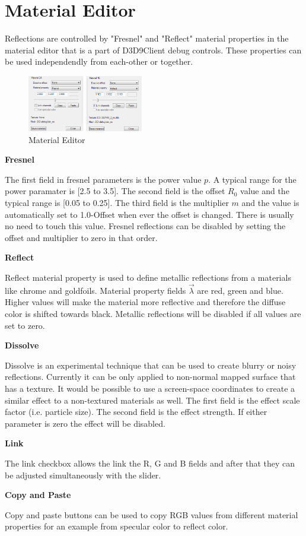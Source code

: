 \documentclass[twocolumn]{report}
\newenvironment{twocol}[0]{%
\begin{list}{}{%
\onecolumn
\setlength{\leftmargin}{0.15cm}%
\setlength{\rightmargin}{0.15cm}%
\setlength{\topmargin}{0cm}%
\setlength{\headheight}{0cm}%
\setlength{\headsep}{0cm}%
\setlength{\textheight}{24cm}%
}%
\item[]}{\end{list}}
\begin{document}
\begin{twocol}

\section*{Material Editor}

Reflections are controlled by "Fresnel" and "Reflect" material properties in the material editor that is a part of D3D9Client debug controls. These properties can be used independendly from each-other or together.

\begin{figure}[h]
	\centering
	\includegraphics[width=0.45\textwidth]{images/materialed.png}
	\caption{Material Editor}
\end{figure}

\textbf{Fresnel}

The first field in fresnel parameters is the power value $p$. A typical range for the power paramater is [2.5 to 3.5]. The second field is the offset $R_0$ value and the typical range is [0.05 to 0.25]. The third field is the multiplier $m$ and the value is automatically set to 1.0-Offset when ever the offset is changed. There is usually no need to touch this value. Fresnel reflections can be disabled by setting the offset and multiplier to zero in that order.  

\textbf{Reflect}

Reflect material property is used to define metallic reflections from a materials like chrome and goldfoils. Material property fields $\vec{\lambda}$ are red, green and blue. Higher values will make the material more reflective and therefore the diffuse color is shifted towards black. Metallic reflections will be disabled if all values are set to zero. 

\textbf{Dissolve}

Dissolve is an experimental technique that can be used to create blurry or noisy reflections. Currently it can be only applied to non-normal mapped surface that has a texture. It would be possible to use a screen-space coordinates to create a similar effect to a non-textured materials as well. The first field is the effect scale factor (i.e. particle size). The second field is the effect strength. If either parameter is zero the effect will be disabled.

\textbf{Link}

The link checkbox allows the link the R, G and B fields and after that they can be adjusted simultaneously with the slider.

\textbf{Copy and Paste}

Copy and paste buttons can be used to copy RGB values from different material properties for an example from specular color to reflect color.

\end{twocol}
\end{document}
